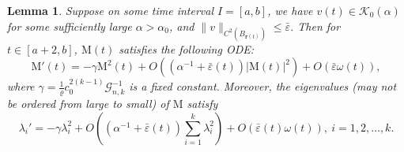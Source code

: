 \documentclass[11pt]{amsart}
\numberwithin{equation}{section}
\newtheorem{lemma}[theorem]{Lemma}
\numberwithin{equation}{section}
\newcommand{\eps}{\varepsilon}
\newcommand{\br}{\mathbf{r}}
\newcommand{\cK}{\mathcal{K}}
\newcommand{\cG}{\mathcal{G}}
\begin{document}
	
	
	\begin{lemma}\label{LmMatrix}
		Suppose on some time interval $I=[a,b]$, we have $v(t)\in \cK_0(\alpha)$ for some sufficiently large $\alpha>\alpha_0$, and $\|v\|_{C^2(B_{\br(t)})}\leq \bar\eps$. Then for $t\in [a+2,b]$, $\mathrm{M}(t)$ satisfies the following ODE:
		\begin{equation}\label{eq:ODE-1}
			\mathrm{M}'(t)=-\gamma \mathrm{M}^2(t) + O((\alpha^{-1}+\bar\eps(t)) |\mathrm{M}(t)|^2)+O(\bar\eps\omega(t)),
		\end{equation}
		where $\gamma=\frac{1}{\varrho}c_0^{2(k-1)}\cG_{n,k}^{-1}$ is a fixed constant. Moreover, the eigenvalues (may not be ordered from large to small) of $\mathrm{M}$ satisfy 
		$$\lambda_i'=-\gamma\lambda_i^2+O((\alpha^{-1}+\bar\eps(t))\sum_{i=1}^k \lambda^2_i)+O(\bar\eps(t)\omega(t)),\ i=1,2,\ldots,k.$$ 
	\end{lemma}
	
\end{document}
